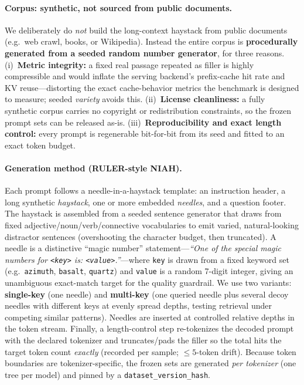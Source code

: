 
\paragraph{Corpus: synthetic, not sourced from public documents.}
We deliberately do \emph{not} build the long-context haystack from public
documents (e.g.\ web crawl, books, or Wikipedia). Instead the entire corpus is
\textbf{procedurally generated from a seeded random number generator}, for three
reasons. (i)~\textbf{Metric integrity:} a fixed real passage repeated as filler
is highly compressible and would inflate the serving backend's prefix-cache hit
rate and KV reuse---distorting the exact cache-behavior metrics the benchmark is
designed to measure; seeded \emph{variety} avoids this. (ii)~\textbf{License
cleanliness:} a fully synthetic corpus carries no copyright or redistribution
constraints, so the frozen prompt sets can be released as-is.
(iii)~\textbf{Reproducibility and exact length control:} every prompt is
regenerable bit-for-bit from its seed and fitted to an exact token budget.

\paragraph{Generation method (RULER-style NIAH).}
Each prompt follows a needle-in-a-haystack template: an instruction header, a long
synthetic \emph{haystack}, one or more embedded \emph{needles}, and a question
footer. The haystack is assembled from a seeded sentence generator that draws from
fixed adjective/noun/verb/connective vocabularies to emit varied, natural-looking
distractor sentences (overshooting the character budget, then truncated). A needle
is a distinctive ``magic number'' statement---\emph{``One of the special magic
numbers for \texttt{<key>} is: \texttt{<value>}.''}---where \texttt{key} is drawn
from a fixed keyword set (e.g.\ \texttt{azimuth}, \texttt{basalt}, \texttt{quartz})
and \texttt{value} is a random 7-digit integer, giving an unambiguous exact-match
target for the quality guardrail. We use two variants: \textbf{single-key}
(one needle) and \textbf{multi-key} (one queried needle plus several decoy needles
with different keys at evenly spread depths, testing retrieval under competing
similar patterns). Needles are inserted at controlled relative depths in the token
stream. Finally, a length-control step re-tokenizes the decoded prompt with the
declared tokenizer and truncates/pads the filler so the total hits the target
token count \emph{exactly} (recorded per sample; $\leq 5$-token drift). Because
token boundaries are tokenizer-specific, the frozen sets are generated \emph{per
tokenizer} (one tree per model) and pinned by a \texttt{dataset\_version\_hash}.
